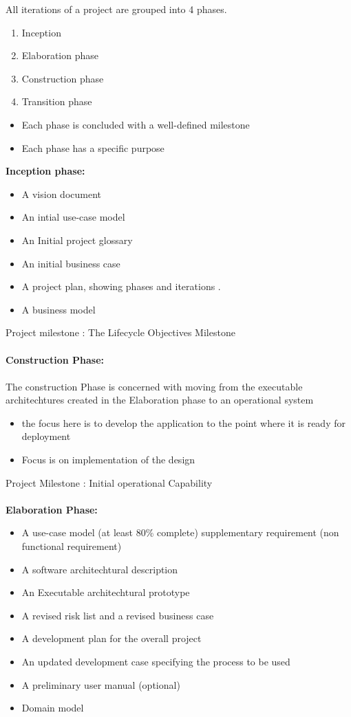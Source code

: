 \documentclass[
	11pt,
	a4paper
]{article}%
\begin{document}
All iterations of a project are grouped into 4 phases.
\begin{enumerate}
\item Inception
\item Elaboration phase
\item Construction phase
\item Transition phase
\end{enumerate}
\begin{itemize}
\item Each phase is concluded with a well-defined milestone
\item Each phase has a specific purpose
\end{itemize}
\textbf{Inception phase:}
\begin{itemize}
\item A vision document
\item An intial use-case model
\item An Initial project glossary
\item An initial business case
\item A project plan, showing phases and iterations .
\item A business model
\end{itemize}
Project milestone : The Lifecycle Objectives Milestone
\\\\
\textbf{Construction Phase:}\\\\
The construction Phase is concerned with moving from the executable architechtures created in the Elaboration phase to an operational system
\begin{itemize}
\item the focus here is to develop the application to the point where it is ready for deployment
\item Focus is on implementation of the design
\end{itemize}
Project Milestone : Initial operational Capability 
\\\\
\textbf{Elaboration Phase:}
\begin{itemize}
\item A use-case model (at least 80\% complete) supplementary requirement (non functional requirement)
\item A software architechtural description
\item An Executable architechtural prototype 
\item A revised risk list and a revised business case 
\item A development plan for the overall project 
\item An updated development case specifying the process to be used 
\item A preliminary user manual (optional)
\item Domain model
\end{itemize}
\end{document}
